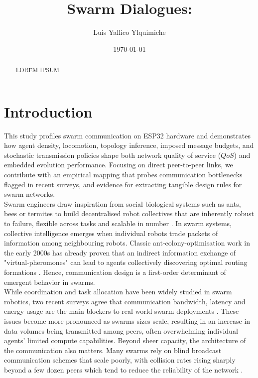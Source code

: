 \documentclass[conference]{IEEEtran}
\title{Swarm Dialogues: 
}
\author{Luis Yallico Ylquimiche}
\date{\today}
\begin{document}
\maketitle
\pagestyle{plain}

\begin{abstract}
LOREM IPSUM
\end{abstract}


\section{Introduction}

This study profiles swarm communication on ESP32 hardware and demonstrates how agent density, locomotion, topology inference, imposed message budgets, and stochastic transmission policies shape both network quality of service ($QoS$) and embedded evolution performance. Focusing on direct peer-to-peer links, we contribute with an empirical mapping that probes communication bottlenecks flagged in recent surveys, and evidence for extracting tangible design rules for swarm networks. \\

Swarm engineers draw inspiration from social biological systems such as ants, bees or termites to build decentralised robot collectives that are inherently robust to failure, flexible across tasks and scalable in number \cite{hamann_swarm_2018}. In swarm systems, collective intelligence emerges when individual robots trade packets of information among neighbouring robots. Classic ant-colony-optimisation work in the early 2000s has already proven that an indirect information exchange of "virtual-pheromones" can lead to agents collectively discovering optimal routing formations \cite{dorigo_ant_2000}. Hence, communication design is a first-order determinant of emergent behavior in swarms. \\

While coordination and task allocation have been widely studied in swarm robotics, two recent surveys agree that communication bandwidth, latency and energy usage are the main blockers to real-world swarm deployments \cite{ding_advancements_2023}\cite{an_multi-robot_2023}. These issues become more pronounced as swarms sizes scale, resulting in an increase in data volumes being transmitted among peers, often overwhelming individual agents' limited compute capabilities. Beyond sheer capacity, the architecture of the communication also matters. Many swarms rely on blind broadcast communication schemes that scale poorly, with collision rates rising sharply beyond a few dozen peers which tend to reduce the reliability of the network \cite{an_multi-robot_2023}. \\
\end{document}

